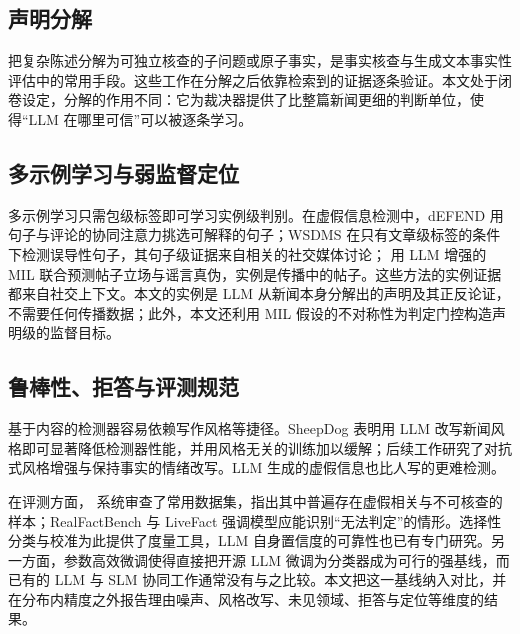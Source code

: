 \subsection{声明分解}

把复杂陈述分解为可独立核查的子问题或原子事实，是事实核查与生成文本事实性评估中的常用手段\citep{chen2022claimdecomp,pan2023programfc,zhang2023hiss,min2023factscore}。这些工作在分解之后依靠检索到的证据逐条验证。本文处于闭卷设定，分解的作用不同：它为裁决器提供了比整篇新闻更细的判断单位，使得“LLM 在哪里可信”可以被逐条学习。

\subsection{多示例学习与弱监督定位}

多示例学习只需包级标签即可学习实例级判别\citep{dietterich1997solving,maron1998framework,ilse2018attention,carbonneau2018mil}。在虚假信息检测中，dEFEND\citep{shu2019defend} 用句子与评论的协同注意力挑选可解释的句子；WSDMS\citep{yang2023wsdms} 在只有文章级标签的条件下检测误导性句子，其句子级证据来自相关的社交媒体讨论；\citet{yang2025llmmil} 用 LLM 增强的 MIL 联合预测帖子立场与谣言真伪，实例是传播中的帖子。这些方法的实例证据都来自社交上下文。本文的实例是 LLM 从新闻本身分解出的声明及其正反论证，不需要任何传播数据；此外，本文还利用 MIL 假设的不对称性为判定门控构造声明级的监督目标。

\subsection{鲁棒性、拒答与评测规范}

基于内容的检测器容易依赖写作风格等捷径\citep{geirhos2020shortcut}。SheepDog\citep{wu2024sheepdog} 表明用 LLM 改写新闻风格即可显著降低检测器性能，并用风格无关的训练加以缓解；后续工作研究了对抗式风格增强\citep{park2024adstyle}与保持事实的情绪改写\citep{guo2026emotion}。LLM 生成的虚假信息也比人写的更难检测\citep{chen2024can,chen2024combating}。

在评测方面，\citet{thibault2025guide} 系统审查了常用数据集，指出其中普遍存在虚假相关与不可核查的样本；RealFactBench\citep{yang2025realfactbench} 与 LiveFact\citep{xu2026livefact} 强调模型应能识别“无法判定”的情形。选择性分类\citep{geifman2017selective,geifman2019bias}与校准\citep{guo2017calibration}为此提供了度量工具，LLM 自身置信度的可靠性也已有专门研究\citep{xiong2024can,tian2023just}。另一方面，参数高效微调\citep{hu2022lora}使得直接把开源 LLM 微调为分类器成为可行的强基线\citep{raza2024comparative}，而已有的 LLM 与 SLM 协同工作通常没有与之比较。本文把这一基线纳入对比，并在分布内精度之外报告理由噪声、风格改写、未见领域、拒答与定位等维度的结果。
